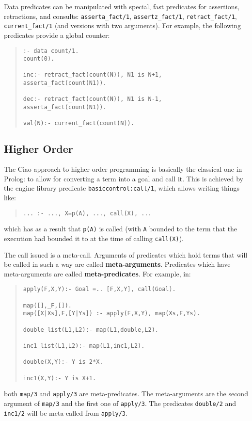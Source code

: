 Data predicates can be manipulated with special, fast predicates for
assertions, retractions, and consults: \verb+asserta_fact/1+,
\verb+assertz_fact/1+, \verb+retract_fact/1+, \verb+current_fact/1+
(and versions with two arguments).
For example, the following predicates provide a global counter:
\begin{quote}
\begin{verbatim}
:- data count/1.
count(0).

inc:- retract_fact(count(N)), N1 is N+1, asserta_fact(count(N1)).

dec:- retract_fact(count(N)), N1 is N-1, asserta_fact(count(N1)).

val(N):- current_fact(count(N)).
\end{verbatim}
\end{quote}


\subsection{Higher Order}
\label{sec:ho}

The Ciao approach to higher order programming is basically the
classical one in Prolog: to allow for converting a term into a goal
and call it. This is achieved by the engine library predicate
\verb+basiccontrol:call/1+, which allows writing things like:
\begin{quote}
\begin{verbatim}
... :- ..., X=p(A), ..., call(X), ...
\end{verbatim}
\end{quote}
%
which has as a result that \verb+p(A)+ is called (with \verb+A+ bounded to
the term that the execution had bounded it to at the time of calling
\verb+call(X)+). 

The call issued is a meta-call. Arguments of predicates which hold
terms that will be called in such a way are called {\bf meta-arguments}. 
Predicates which have meta-arguments are called {\bf
  meta-predicates}. For example, in:
\begin{quote}
\begin{verbatim}
apply(F,X,Y):- Goal =.. [F,X,Y], call(Goal).

map([],_F,[]).
map([X|Xs],F,[Y|Ys]) :- apply(F,X,Y), map(Xs,F,Ys).

double_list(L1,L2):- map(L1,double,L2).

inc1_list(L1,L2):- map(L1,inc1,L2).

double(X,Y):- Y is 2*X.

inc1(X,Y):- Y is X+1.
\end{verbatim}
\end{quote}
%
both \verb+map/3+ and \verb+apply/3+ are meta-predicates. The
meta-arguments are the second argument of \verb+map/3+ and the first
one of \verb+apply/3+. The predicates \verb+double/2+ and
\verb+inc1/2+ will be meta-called from \verb+apply/3+.

